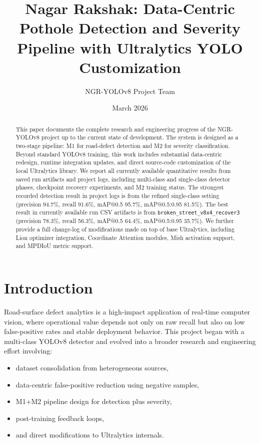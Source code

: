 \documentclass[twocolumn]{article}
\title{\textbf{Nagar Rakshak: Data-Centric Pothole Detection and Severity Pipeline with Ultralytics YOLO Customization}}
\author{NGR-YOLOv8 Project Team}
\date{March 2026}
\begin{document}
\maketitle

\begin{abstract}
\noindent
This paper documents the complete research and engineering progress of the NGR-YOLOv8 project up to the current state of development. The system is designed as a two-stage pipeline: M1 for road-defect detection and M2 for severity classification. Beyond standard YOLOv8 training, this work includes substantial data-centric redesign, runtime integration updates, and direct source-code customization of the local Ultralytics library. We report all currently available quantitative results from saved run artifacts and project logs, including multi-class and single-class detector phases, checkpoint recovery experiments, and M2 training status. The strongest recorded detection result in project logs is from the refined single-class setting (precision 94.7\%, recall 91.6\%, mAP@0.5 95.7\%, mAP@0.5:0.95 81.5\%). The best result in currently available run CSV artifacts is from \texttt{broken\_street\_v8x4\_recover3} (precision 78.3\%, recall 56.3\%, mAP@0.5 64.4\%, mAP@0.5:0.95 35.7\%). We further provide a full change-log of modifications made on top of base Ultralytics, including Lion optimizer integration, Coordinate Attention modules, Mish activation support, and MPDIoU metric support.
\end{abstract}

\section{Introduction}
Road-surface defect analytics is a high-impact application of real-time computer vision, where operational value depends not only on raw recall but also on low false-positive rates and stable deployment behavior. This project began with a multi-class YOLOv8 detector and evolved into a broader research and engineering effort involving:
\begin{itemize}
    \item dataset consolidation from heterogeneous sources,
    \item data-centric false-positive reduction using negative samples,
    \item M1+M2 pipeline design for detection plus severity,
    \item post-training feedback loops,
    \item and direct modifications to Ultralytics internals.
\end{itemize}
\end{document}
